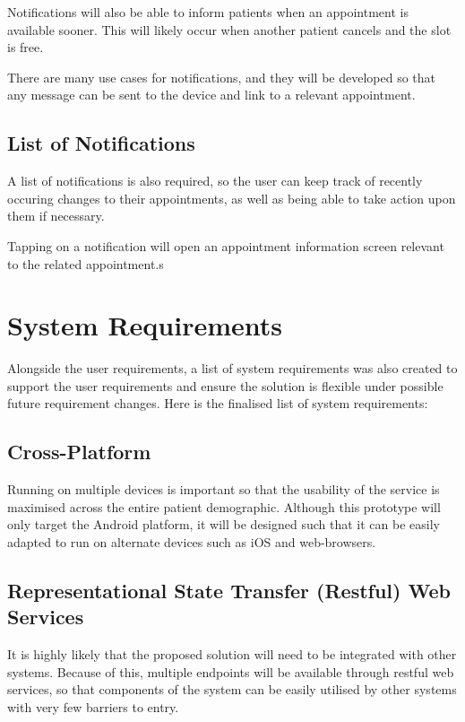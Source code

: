 Notifications will also be able to inform patients when an appointment is available sooner. This will likely occur when another patient cancels and the slot is free.

There are many use cases for notifications, and they will be developed so that any message can be sent to the device and link to a relevant appointment.

\subsection{List of Notifications}

A list of notifications is also required, so the user can keep track of recently occuring changes to their appointments, as well as being able to take action upon them if necessary.

Tapping on a notification will open an appointment information screen relevant to the related appointment.s


\section{System Requirements}

Alongside the user requirements, a list of system requirements was also created to support the user requirements and ensure the solution is flexible under possible future requirement changes. Here is the finalised list of system requirements:

\subsection{Cross-Platform}

Running on multiple devices is important so that the usability of the service is maximised across the entire patient demographic. Although this prototype will only target the Android platform, it will be designed such that it can be easily adapted to run on alternate devices such as iOS and web-browsers.

\subsection{Representational State Transfer (Restful) Web Services}

It is highly likely that the proposed solution will need to be integrated with other systems. Because of this, multiple endpoints will be available through restful web services, so that components of the system can be easily utilised by other systems with very few barriers to entry.

